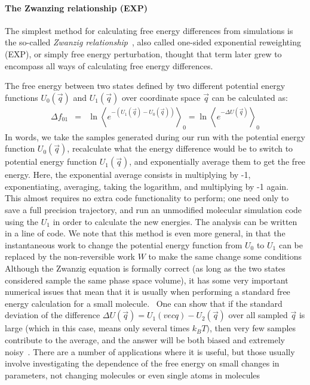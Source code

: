 \documentclass[9pt,bestpractices]{livecoms}
\newcommand{\expect}[1]{\left\langle{#1}\right\rangle}
\begin{document}
\paragraph{The Zwanzing relationship (EXP)}

The simplest method for calculating free energy
differences from simulations is the so-called \textit{Zwanzig
relationship}~\cite{zwanzig1954hightemperature}, also called one-sided exponential reweighting (EXP), or simply free energy perturbation, thought that term later grew to encompass all ways of calculating free energy differences.

The free energy between two states defined by two different potential energy functions 
$U_0(\vec{q})$ and $U_1(\vec{q})$ over coordinate space $\vec{q}$ can be calculated as:
\begin{eqnarray}
\Delta f_{01} & = & \ln \expect{e^{-(U_1(\vec{q}) - U_0(\vec{q}))}}_0 =  \ln \expect{e^{-\Delta U(\vec{q})} }_0
\end{eqnarray}\label{eqn.zwanzig}
In words, we take the samples generated during our run with the potential energy function $U_0(\vec{q})$, recalculate what the energy difference would be to switch to potential energy function $U_1(\vec{q})$, and exponentially average them to get the free energy.  Here, the exponential average consists in multiplying by -1, exponentiating, averaging, taking the logarithm, and multiplying by -1 again.  This almost requires no extra code functionality to perform; one need only to save a full precision trajectory, and run an unmodified molecular simulation code using the $U_1$ in order to calculate the new energies.  The analysis can be written in a line of code.  We note that this method is even more general, in that the instantaneous work to change the potential energy function from $U_0$ to $U_1$ can be replaced by the non-reversible work $W$ to make the same change some conditions~\cite{xx} 
Although the Zwanzig equation is formally correct (as long as the two states considered sample the same phase space volume), it has some very important numerical issues that mean that it is usually when performing a standard free energy calculation for a small molecule.~\cite{shirts2005comparison,lu2003appropriate}  One can show that if the standard deviation of the difference $\Delta U(\vec{q}) = U_1(vec{q})-U_2(\vec{q})$ over all sampled $\vec{q}$ is large (which in this case, means only several times $k_BT)$, then very few samples contribute to the average, and the answer will be both biased and extremely noisy~\cite{xx}.  There are a number of applications where it is useful, but those usually involve investigating the dependence of the free energy on small changes in parameters, not changing molecules or even single atoms in molecules~\cite{xx}
\end{document}
